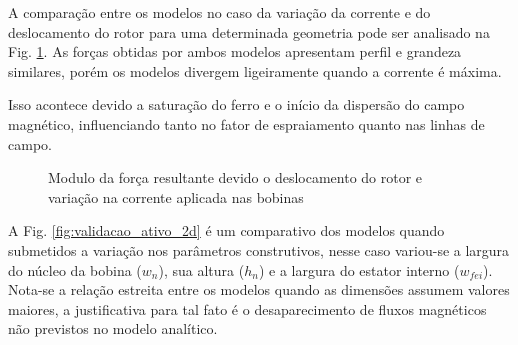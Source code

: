 A comparação entre os modelos no caso da variação da corrente e do deslocamento do rotor para uma determinada geometria pode ser analisado na Fig. \ref{Fig:simulacoes:ativo:comparacao:dx:i}. As forças obtidas por ambos modelos apresentam perfil e grandeza similares, porém os modelos divergem ligeiramente quando a corrente é máxima.

Isso acontece devido a saturação do ferro e o início da dispersão do campo magnético, influenciando tanto no fator de espraiamento quanto nas linhas de campo. 

	\begin{figure}[!ht]
		
		\caption{Modulo da força resultante devido o deslocamento do rotor e variação na corrente aplicada nas bobinas}
		\label{Fig:simulacoes:ativo:comparacao:dx:i}
	\end{figure}

A Fig. \ref{fig:validacao_ativo_2d} é um comparativo dos modelos quando submetidos a variação nos parâmetros construtivos, nesse caso variou-se a largura do núcleo da bobina ($w_n$), sua altura ($h_n$) e a largura do estator interno ($w_{fei}$). Nota-se a relação estreita entre os modelos quando as dimensões assumem valores maiores, a justificativa para tal fato é o desaparecimento de fluxos magnéticos não previstos no modelo analítico.


